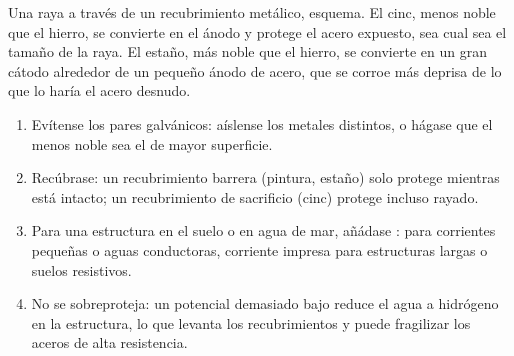 \begin{omfigure}

{\small Una raya a través de un recubrimiento metálico, esquema. El cinc, menos noble que el
hierro, se convierte en el ánodo y protege el acero expuesto, sea cual sea el tamaño de
la raya. El estaño, más noble que el hierro, se convierte en un gran cátodo alrededor de un pequeño
ánodo de acero, que se corroe más deprisa de lo que lo haría el acero desnudo.}
\end{omfigure}

\begin{method}\label{met:b2:corrosion:choose-protection}
\begin{enumerate}
  \item Evítense los pares galvánicos: aíslense los metales distintos, o hágase que el menos
        noble sea el de mayor superficie.
  \item Recúbrase: un recubrimiento barrera (pintura, estaño) solo protege mientras está intacto; un
        recubrimiento de sacrificio (cinc) protege incluso rayado.
  \item Para una estructura en el suelo o en agua de mar, añádase :
         para corrientes pequeñas o aguas conductoras,
        corriente impresa para estructuras largas o suelos resistivos.
  \item No se sobreproteja: un potencial demasiado bajo reduce el agua a hidrógeno en
        la estructura, lo que levanta los recubrimientos y puede fragilizar los aceros de alta
        resistencia.
\end{enumerate}
\end{method}

